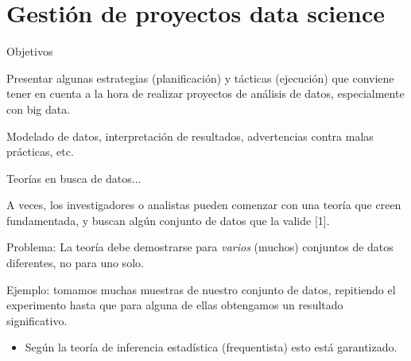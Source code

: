 \section{Gestión de proyectos data science}

\begin{frame}{Objetivos}
  \begin{wideitemize}
  \item Presentar algunas estrategias (planificación) y tácticas (ejecución)
  que conviene tener en cuenta a la hora de realizar proyectos de análisis de
  datos, especialmente con big data.
  
  \item Modelado de datos, interpretación de resultados, advertencias contra
  malas prácticas, etc.

 \end{wideitemize}

\end{frame}


\begin{frame}{Teorías en busca de datos...}
  \begin{wideitemize}
  \item A veces, los investigadores o analistas pueden comenzar con una teoría
  que creen fundamentada, y buscan algún conjunto de datos que la valide [1].
  
  \item Problema: La teoría debe demostrarse para \textit{varios} (muchos)
  conjuntos de datos diferentes, no para uno solo.
  
  \item Ejemplo: tomamos muchas muestras de nuestro conjunto de datos, repitiendo
  el experimento hasta que para alguna de ellas obtengamos un resultado significativo.
  
  \begin{itemize}
   \item Según la teoría de inferencia estadística (frequentista) esto está
   garantizado.
  \end{itemize}

 \end{wideitemize}

\end{frame}


